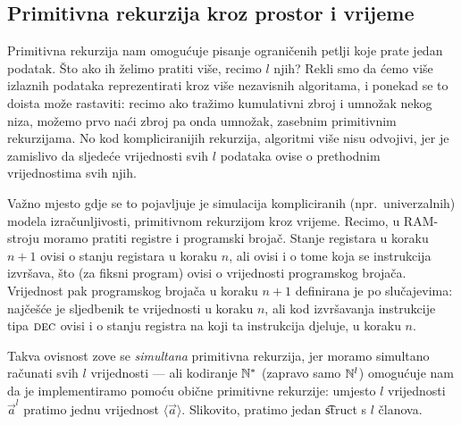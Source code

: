 \subsection{Primitivna rekurzija kroz prostor i vrijeme}

Primitivna rekurzija nam omogućuje pisanje ograničenih petlji koje prate jedan podatak. Što ako ih želimo pratiti više, recimo $l$ njih? Rekli smo da ćemo više izlaznih podataka reprezentirati kroz više nezavisnih algoritama, i ponekad se to doista može rastaviti: recimo ako tražimo kumulativni zbroj i umnožak nekog niza, možemo prvo naći zbroj pa onda umnožak, zasebnim primitivnim rekurzijama. No kod kompliciranijih rekurzija, algoritmi više nisu odvojivi, jer je zamislivo da sljedeće vrijednosti svih $l$ podataka ovise o prethodnim vrijednostima svih njih.

Važno mjesto gdje se to pojavljuje je simulacija kompliciranih (npr.\ univerzalnih) modela izračunljivosti, primitivnom rekurzijom kroz vrijeme. Recimo, u RAM-stroju moramo pratiti registre i programski brojač. Stanje registara u koraku $n+1$ ovisi o stanju registara u koraku $n$, ali ovisi i o tome koja se instrukcija izvršava, što (za fiksni program) ovisi o vrijednosti programskog brojača. Vrijednost pak programskog brojača u koraku $n+1$ definirana je po slučajevima: najčešće je sljedbenik te vrijednosti u koraku $n$, ali kod izvršavanja instrukcije tipa $\textsc{dec}$ ovisi i o stanju registra na koji ta instrukcija djeluje, u koraku $n$.

Takva ovisnost zove se \emph{simultana} primitivna rekurzija, jer moramo simultano ra\-ču\-na\-ti svih $l$ vrijednosti --- ali kodiranje ${\mathbb N}^*$ (zapravo samo ${\mathbb N}^l$) omogućuje nam da je implementiramo pomoću obične primitivne rekurzije: umjesto $l$ vrijednosti $\vec a^l$ pratimo jednu vrijednost $\langle\vec a\rangle$. Slikovito, pratimo jedan \t{struct} s $l$ članova.

